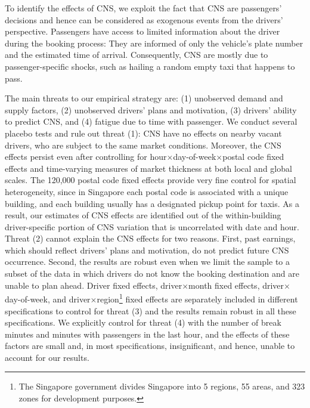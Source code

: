 \documentclass[reviewmode,AEJ]{AEA}
\begin{document}

To identify the effects of CNS, we exploit the fact that CNS are passengers' decisions 
and hence can be considered as exogenous events from the drivers' perspective.
Passengers have access to limited information about the driver during the booking process: They are informed of only the vehicle's plate number and the estimated time of arrival. Consequently, CNS are mostly due to passenger-specific shocks, such as hailing a random empty taxi that happens to pass.

The main threats to our empirical strategy are: (1) unobserved demand and supply factors, (2) unobserved drivers' plans and motivation, (3) drivers' ability to predict CNS, and (4) fatigue due to time with passenger. We conduct several placebo tests and rule out threat (1): CNS have no effects on nearby vacant drivers, who are subject to the same market conditions. Moreover, the CNS effects persist even after controlling for hour\(\times\)day-of-week\(\times\)postal code fixed effects and time-varying measures of market thickness at both local and global scales.
The 120,000 postal code fixed effects provide very fine control for spatial 
heterogeneity, since in Singapore each postal code is associated with a unique building, and each building
usually has a designated pickup point for taxis. As a result, our estimates of CNS effects are identified 
out of the within-building driver-specific portion of CNS variation that is uncorrelated with date and hour. 
Threat (2) cannot explain the CNS effects for two reasons. First, past earnings, which should reflect drivers' plans and motivation, do not predict future CNS occurrence. Second, the results are robust even when we limit the sample to a subset of the data in which drivers do not know the booking destination and are unable to plan ahead. Driver fixed effects, driver\(\times\)month fixed effects, driver\(\times\)day-of-week, and driver\(\times\)region\footnote {The Singapore government divides Singapore into 5 regions, 55 areas, and 323 zones for development purposes.} fixed effects are separately included in different specifications to control for threat (3) and the results remain robust in all these specifications. We explicitly control for threat (4) with the number of break minutes and minutes with passengers in the last hour, and the effects of these factors are small and, in most specifications, insignificant, and hence, unable to account for our results.
\end{document}
